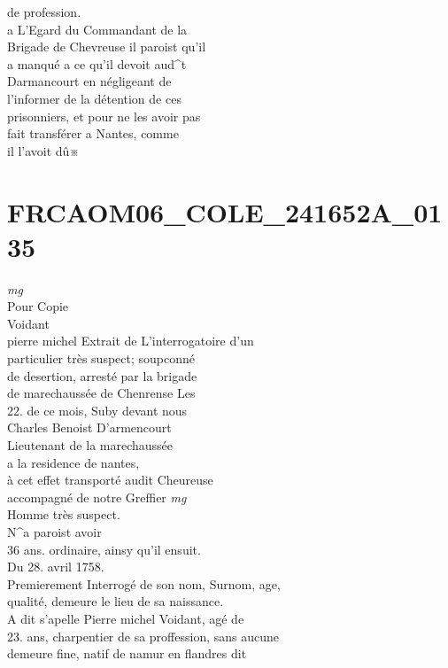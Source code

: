 \documentclass{article}
\begin{document}
\begin{pages}
de profession.\\
a L'Egard du Commandant de la\\
Brigade de Chevreuse il paroist qu'il\\
a manqué a ce qu'il devoit aud\^{}t\\
Darmancourt en négligeant de\\
l'informer de la détention de ces\\
prisonniers, et pour ne les avoir pas\\
fait transférer a Nantes, comme\\
il  l'avoit dû※
\pend
\endnumbering\beginnumbering\section{FRCAOM06\_COLE\_241652A\_0135}
\vspace{0.5cm}\noindent
\textit{mg}
\footnotesize \\
Pour Copie\\
Voidant\\
pierre michel
\normalsize \pstart
Extrait de L'interrogatoire d'un\\
particulier très suspect; soupconné\\
de desertion, arresté par la brigade\\
de marechaussée de Chenrense Les\\
22. de ce mois, Suby devant nous\\
Charles Benoist D'armencourt\\
Lieutenant de la marechaussée\\
a la residence de nantes,\\
à cet effet transporté audit Cheureuse\\
accompagné de notre Greffier
\pend
\vspace{0.5cm}\noindent
\textit{mg}
\footnotesize \\
Homme très suspect.\\
N\^{}a paroist avoir\\
36 ans.
\normalsize \pstart
ordinaire, ainsy qu'il ensuit.\\
Du 28. avril 1758.\\
Premierement Interrogé de son nom, Surnom, age,\\
qualité, demeure le lieu de sa naissance.\\
A dit s'apelle Pierre michel Voidant, agé de\\
23. ans, charpentier de sa proffession, sans aucune\\
demeure fine, natif de namur en flandres dit\\

\end{pages}
\end{document}
